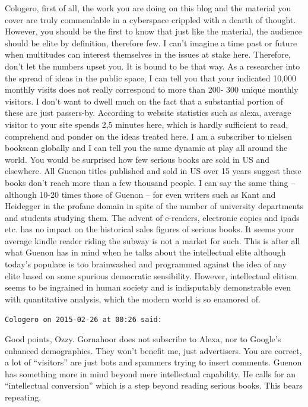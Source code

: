 \begin{footnotesize}
\begin{sffamily}
Cologero, first of all, the work you are doing on this blog and the material you cover are truly commendable in a cyberspace crippled with a dearth of thought. However, you should be the first to know that just like the material, the audience should be elite by definition, therefore few. I can't imagine a time past or future when multitudes can interest themselves in the issues at stake here. Therefore, don't let the numbers upset you. It is bound to be that way. As a researcher into the spread of ideas in the public space, I can tell you that your indicated 10,000 monthly visits does not really correspond to more than 200- 300 unique monthly visitors. I don't want to dwell much on the fact that a substantial portion of these are just passers-by. According to website statistics such as alexa, average visitor to your site spends 2,5 minutes here, which is hardly sufficient to read, comprehend and ponder on the ideas treated here. I am a subscriber to nielsen bookscan globally and I can tell you the same dynamic at play all around the world. You would be surprised how few serious books are sold in US and elsewhere. All Guenon titles published and sold in US over 15 years suggest these books don't reach more than a few thousand people. I can say the same thing -- although 10-20 times those of Guenon -- for even writers such as Kant and Heidegger in the profane domain in spite of the number of university departments and students studying them. The advent of e-readers, electronic copies and ipads etc. has no impact on the historical sales figures of serious books. It seems your average kindle reader riding the subway is not a market for such. This is after all what Guenon has in mind when he talks about the intellectual elite although today's populace is too brainwashed and programmed against the idea of any elite based on some spurious democratic sensibility. However, intellectual elitism seems to be ingrained in human society and is indisputably demonstrable even with quantitative analysis, which the modern world is so enamored of.

\hfill

\texttt{Cologero on 2015-02-26 at 00:26 said:}

Good points, Ozzy. Gornahoor does not subscribe to Alexa, nor to Google's enhanced demographics. They won't benefit me, just advertisers. You are correct, a lot of ``visitors'' are just bots and spammers trying to insert comments. Guenon has something more in mind beyond mere intellectual capability. He calls for an ``intellectual conversion'' which is a step beyond reading serious books. This bears repeating.


\end{sffamily}
\end{footnotesize}
